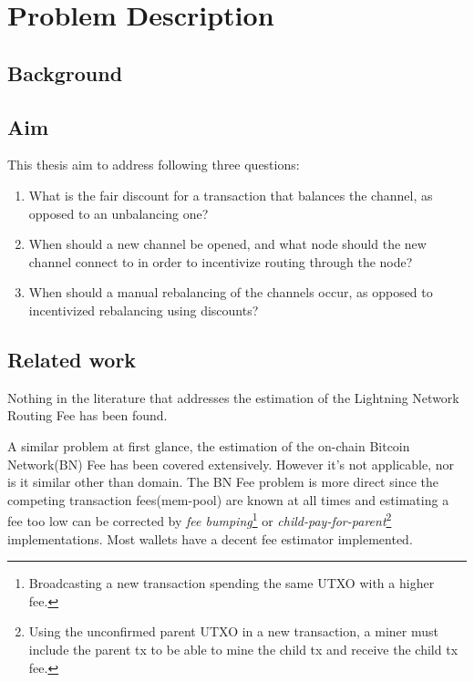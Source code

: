 \chapter{Problem Description}

\section{Background}
    \label{sec:background}

\section{Aim}
    \label{sec:aim}

This thesis aim to address following three questions:

    \begin{enumerate}
	\item What is the fair discount for a transaction that balances the channel, as
		opposed to an unbalancing one?
	\item When should a new channel be opened, and what node should the new
		channel connect to in order to incentivize routing through the node?
	\item When should a manual rebalancing of the channels occur, as opposed to
		incentivized rebalancing using discounts?
    \end{enumerate}

\section{Related work}
    \label{sec:related_work}

	Nothing in the literature that addresses the estimation of the Lightning
	Network Routing Fee has been found. 
	
	A similar problem at first glance, the estimation of the on-chain
	Bitcoin Network(BN) Fee has been covered extensively. However it's not applicable, nor
	is it similar other than domain. The BN Fee problem is more direct since the competing transaction 
	fees(mem-pool) are known at all times and estimating a fee too low can be corrected by \textit{fee bumping}\footnote{Broadcasting a new transaction spending the same UTXO with a higher fee.} or 
	\textit{child-pay-for-parent}\footnote{Using the unconfirmed parent UTXO in a new transaction, a miner must include the parent tx to be able to mine the child tx  and receive the child tx fee.} implementations. Most wallets have a decent fee estimator implemented.
	
